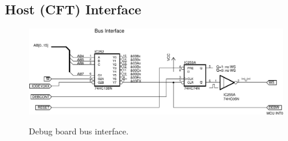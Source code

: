 \subsection{Host (CFT) Interface}

\begin{figure}
\centering
\includegraphics[width=\columnwidth]{figs/deb-bus-interface.pdf}\\
\caption{\label{fig-deb-bus-interface}Debug board bus interface.}
\end{figure}

